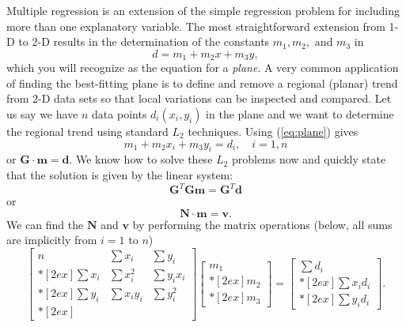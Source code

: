 	Multiple regression is an extension of the simple regression problem for including more than 
one explanatory variable.  The most straightforward extension from 1-D to 2-D results in the 
determination of the constants $m_1, m_2,$ and $m_3$ in
\begin{equation}
d = m_1 + m_2 x + m_3 y,
\label{eq:plane}
\end{equation}
which you will recognize as the equation for a \emph{plane}.  A very common application of finding the 
best-fitting plane is to define and remove a regional (planar) trend from 2-D data sets so that 
local variations can be inspected and compared.  Let us say we have $n$ data points $d_i(x_i, y_i)$ in the 
plane and we want to determine the regional trend using standard $L_2$ techniques.  Using (\ref{eq:plane}) 
gives
\begin{equation}
m_1 + m_2 x_i + m_3y_i = d_i,\quad i = 1,n
\end{equation}
or $\mathbf{G\cdot m=d}$.  We know how to solve these $L_2$ problems now and quickly state that the solution is 
given by the linear system:
\begin{equation}
\mathbf{G}^T \mathbf{Gm = G}^T \mathbf{d}
\end{equation}
or 
\begin{equation}
\mathbf{	N\cdot m = v}.
\end{equation}
We can find the $\mathbf{N}$ and $\mathbf{v}$ by performing the matrix operations (below, all sums are implicitly from $i = 1$ to $n$)
\begin{equation}
\left [ \begin{array}{ccc}
n & \displaystyle \sum x_i & \displaystyle \sum y_i \\*[2ex]
\displaystyle \sum x_i & \displaystyle \sum x^2_i & \displaystyle \sum y_i x_i \\*[2ex]
\displaystyle \sum y_i & \displaystyle \sum x_i y_i & \displaystyle \sum y^2_i \\*[2ex]
\end{array} \right ]
\left[ \begin{array}{c}
m_1 \\*[2ex]
m_2 \\*[2ex]
m_3 
\end{array} \right]  = 
\left[ \begin{array}{c}
\displaystyle \sum d_i \\*[2ex] \displaystyle \sum x_i d_i\\*[2ex] 
\displaystyle \sum y_i d_i
\end{array} \right ].
\end{equation}	 
